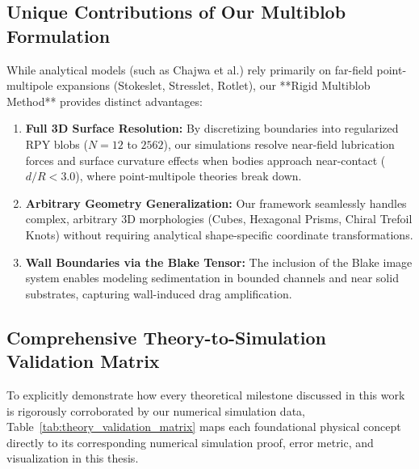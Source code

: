 \documentclass[11pt,a4paper]{article}
\begin{document}
\subsection{Unique Contributions of Our Multiblob Formulation}
While analytical models (such as Chajwa et al.) rely primarily on far-field point-multipole expansions (Stokeslet, Stresslet, Rotlet), our **Rigid Multiblob Method** provides distinct advantages:
\begin{enumerate}
    \item \textbf{Full 3D Surface Resolution:} By discretizing boundaries into regularized RPY blobs ($N = 12$ to $2562$), our simulations resolve near-field lubrication forces and surface curvature effects when bodies approach near-contact ($d/R < 3.0$), where point-multipole theories break down.
    \item \textbf{Arbitrary Geometry Generalization:} Our framework seamlessly handles complex, arbitrary 3D morphologies (Cubes, Hexagonal Prisms, Chiral Trefoil Knots) without requiring analytical shape-specific coordinate transformations.
    \item \textbf{Wall Boundaries via the Blake Tensor:} The inclusion of the Blake image system enables modeling sedimentation in bounded channels and near solid substrates, capturing wall-induced drag amplification.
\end{enumerate}

\subsection{Comprehensive Theory-to-Simulation Validation Matrix}
To explicitly demonstrate how every theoretical milestone discussed in this work is rigorously corroborated by our numerical simulation data, Table~\ref{tab:theory_validation_matrix} maps each foundational physical concept directly to its corresponding numerical simulation proof, error metric, and visualization in this thesis.
\end{document}
